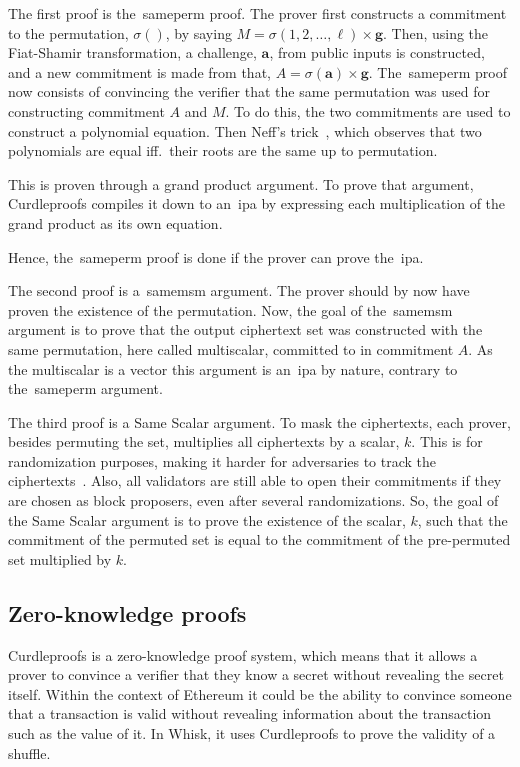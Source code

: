 The first proof is the~\gls{sameperm} proof.
The prover first constructs a commitment to the permutation, $\sigma()$, by saying $M=\sigma(1,2,\dots,\ell)\times\mathbf{g}$.
Then, using the Fiat-Shamir transformation, a challenge, $\mathbf{a}$, from public inputs is constructed, and a new commitment is made from that, $A=\sigma(\mathbf{a})\times\mathbf{g}$.
The~\gls{sameperm} proof now consists of convincing the verifier that the same permutation was used for constructing commitment $A$ and $M$.
To do this, the two commitments are used to construct a polynomial equation.
Then Neff's trick~\cite{10.1145/501983.502000}, which observes that two polynomials are equal iff.\ their roots are the same up to permutation.

This is proven through a grand product argument.
To prove that argument, Curdleproofs compiles it down to an~\gls{ipa} by expressing each multiplication of the grand product as its own equation.

Hence, the~\gls{sameperm} proof is done if the prover can prove the~\gls{ipa}.


The second proof is a~\gls{samemsm} argument.
The prover should by now have proven the existence of the permutation.
Now, the goal of the~\gls{samemsm} argument is to prove that the output ciphertext set was constructed with the same permutation, here called multiscalar, committed to in commitment $A$.
As the multiscalar is a vector this argument is an~\gls{ipa} by nature, contrary to the~\gls{sameperm} argument.

The third proof is a Same Scalar argument.
To mask the ciphertexts, each prover, besides permuting the set, multiplies all ciphertexts by a scalar, $k$.
This is for randomization purposes, making it harder for adversaries to track the ciphertexts~\cite{Whisk2024}.
Also, all validators are still able to open their commitments if they are chosen as block proposers, even after several randomizations.
So, the goal of the Same Scalar argument is to prove the existence of the scalar, $k$, such that the commitment of the permuted set is equal to the commitment of the pre-permuted set multiplied by $k$.



\subsection{Zero-knowledge proofs}\label{sec:background-zkps}
Curdleproofs is a zero-knowledge proof system, which means that it allows a prover to convince a verifier that they know a secret without revealing the secret itself.
Within the context of Ethereum it could be the ability to convince someone that a transaction is valid without revealing information about the transaction such as the value of it.
In Whisk, it uses Curdleproofs to prove the validity of a shuffle.

